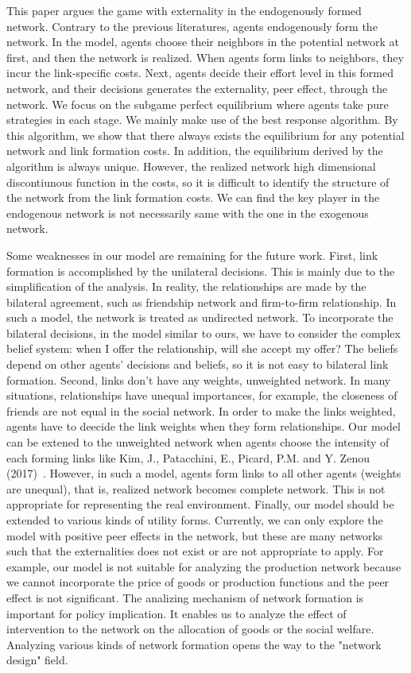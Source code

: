 \documentclass[12pt]{article}
\theoremstyle{definition}
\begin{document}
This paper argues the game with externality in the endogenously formed network.
Contrary to the previous literatures, agents endogenously form the network.
In the model, agents choose their neighbors in the potential network at first, and then the network is realized.
When agents form links to neighbors, they incur the link-specific costs.
Next, agents decide their effort level in this formed network, and their decisions generates the externality, peer effect, through the network.
We focus on the subgame perfect equilibrium where agents take pure strategies in each stage.
We mainly make use of the best response algorithm.
By this algorithm, we show that there always exists the equilibrium for any potential network and link formation costs.
In addition, the equilibrium derived by the algorithm is always unique.
However, the realized network high dimensional discontiunous function in the costs, so it is difficult to identify the structure of the network from the link formation costs.
We can find the key player in the endogenous network is not necessarily same with the one in the exogenous network.

Some weaknesses in our model are remaining for the future work.
First, link formation is accomplished by the unilateral decisions.
This is mainly due to the simplification of the analysis.
In reality, the relationships are made by the bilateral agreement, such as friendship network and firm-to-firm relationship.
In such a model, the network is treated as undirected network.
To incorporate the bilateral decisions, in the model similar to ours, we have to consider the complex belief system: when I offer the relationship, will she accept my offer?
The beliefs depend on other agents' decisions and beliefs, so it is not easy to bilateral link formation.
Second, links don't have any weights, unweighted network.
In many situations, relationships have unequal importances, for example, the closeness of friends are not equal in the social network.
In order to make the links weighted, agents have to deecide the link weights when they form relationships.
Our model can be extened to the unweighted network when agents choose the intensity of each forming links like Kim, J., Patacchini, E., Picard, P.M. and Y. Zenou (2017)~\cite{Urban}.
However, in such a model, agents form links to all other agents (weights are unequal), that is, realized network becomes complete network.
This is not appropriate for representing the real environment.
Finally, our model should be extended to various kinds of utility forms.
Currently, we can only explore the model with positive peer effects in the network, but these are many networks such that the externalities does not exist or are not appropriate to apply.
For example, our model is not suitable for analyzing the production network because we cannot incorporate the price of goods or production functions and the peer effect is not significant.
The analizing mechanism of network formation is important for policy implication.
It enables us to analyze the effect of intervention to the network on the allocation of goods or the social welfare.
Analyzing various kinds of network formation opens the way to the "network design" field.
\end{document}
